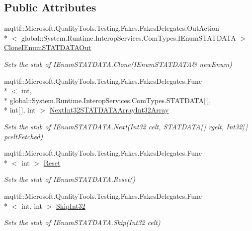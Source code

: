 \subsection*{Public Attributes}
\begin{DoxyCompactItemize}
\item 
mqttf\-::\-Microsoft.\-Quality\-Tools.\-Testing.\-Fakes.\-Fakes\-Delegates.\-Out\-Action\\*
$<$ global\-::\-System.\-Runtime.\-Interop\-Services.\-Com\-Types.\-I\-Enum\-S\-T\-A\-T\-D\-A\-T\-A $>$ \hyperlink{class_system_1_1_runtime_1_1_interop_services_1_1_com_types_1_1_fakes_1_1_stub_i_enum_s_t_a_t_d_a_t_a_ab5325c2556bef3c4a1fae3b052c4211f}{Clone\-I\-Enum\-S\-T\-A\-T\-D\-A\-T\-A\-Out}
\begin{DoxyCompactList}\small\item\em Sets the stub of I\-Enum\-S\-T\-A\-T\-D\-A\-T\-A.\-Clone(I\-Enum\-S\-T\-A\-T\-D\-A\-T\-A\& new\-Enum)\end{DoxyCompactList}\item 
mqttf\-::\-Microsoft.\-Quality\-Tools.\-Testing.\-Fakes.\-Fakes\-Delegates.\-Func\\*
$<$ int, \\*
global\-::\-System.\-Runtime.\-Interop\-Services.\-Com\-Types.\-S\-T\-A\-T\-D\-A\-T\-A\mbox{[}$\,$\mbox{]}, \\*
int\mbox{[}$\,$\mbox{]}, int $>$ \hyperlink{class_system_1_1_runtime_1_1_interop_services_1_1_com_types_1_1_fakes_1_1_stub_i_enum_s_t_a_t_d_a_t_a_aa1b5ba51a8572e5eb4b912e7a345ec3f}{Next\-Int32\-S\-T\-A\-T\-D\-A\-T\-A\-Array\-Int32\-Array}
\begin{DoxyCompactList}\small\item\em Sets the stub of I\-Enum\-S\-T\-A\-T\-D\-A\-T\-A.\-Next(\-Int32 celt, S\-T\-A\-T\-D\-A\-T\-A\mbox{[}$\,$\mbox{]} rgelt, Int32\mbox{[}$\,$\mbox{]} pcelt\-Fetched)\end{DoxyCompactList}\item 
mqttf\-::\-Microsoft.\-Quality\-Tools.\-Testing.\-Fakes.\-Fakes\-Delegates.\-Func\\*
$<$ int $>$ \hyperlink{class_system_1_1_runtime_1_1_interop_services_1_1_com_types_1_1_fakes_1_1_stub_i_enum_s_t_a_t_d_a_t_a_a7c7b30d2e957f48b9d15a1e147c1de73}{Reset}
\begin{DoxyCompactList}\small\item\em Sets the stub of I\-Enum\-S\-T\-A\-T\-D\-A\-T\-A.\-Reset()\end{DoxyCompactList}\item 
mqttf\-::\-Microsoft.\-Quality\-Tools.\-Testing.\-Fakes.\-Fakes\-Delegates.\-Func\\*
$<$ int, int $>$ \hyperlink{class_system_1_1_runtime_1_1_interop_services_1_1_com_types_1_1_fakes_1_1_stub_i_enum_s_t_a_t_d_a_t_a_a0e550a1d32ace9eb74b49555163e8ef3}{Skip\-Int32}
\begin{DoxyCompactList}\small\item\em Sets the stub of I\-Enum\-S\-T\-A\-T\-D\-A\-T\-A.\-Skip(\-Int32 celt)\end{DoxyCompactList}\end{DoxyCompactItemize}


